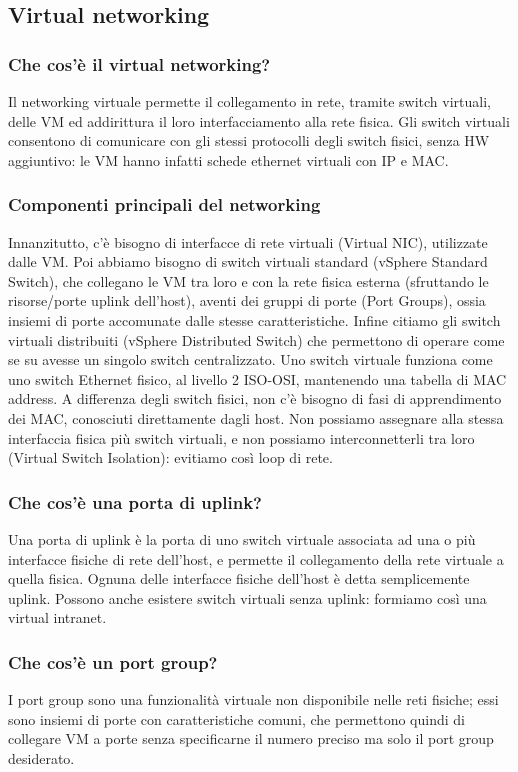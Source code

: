 \documentclass[11pt]{article}
\begin{document}
\subsection{Virtual networking}
\subsubsection{Che cos'è il virtual networking?}
Il networking virtuale permette il collegamento in rete, tramite switch virtuali, delle VM ed addirittura il loro interfacciamento alla rete fisica. Gli switch virtuali consentono di comunicare con gli stessi protocolli degli switch fisici, senza HW aggiuntivo: le VM hanno infatti schede ethernet virtuali con IP e MAC.

\subsubsection{Componenti principali del networking}
Innanzitutto, c'è bisogno di interfacce di rete virtuali (Virtual NIC), utilizzate dalle VM. Poi abbiamo bisogno di switch virtuali standard (vSphere Standard Switch), che collegano le VM tra loro e con la rete fisica esterna (sfruttando le risorse/porte uplink dell'host), aventi dei gruppi di porte (Port Groups), ossia insiemi di porte accomunate dalle stesse caratteristiche. Infine citiamo gli switch virtuali distribuiti (vSphere Distributed Switch) che permettono di operare come se su avesse un singolo switch centralizzato. Uno switch virtuale funziona come uno switch Ethernet fisico, al livello 2 ISO-OSI, mantenendo una tabella di MAC address. A differenza degli switch fisici, non c'è bisogno di fasi di apprendimento dei MAC, conosciuti direttamente dagli host. Non possiamo assegnare alla stessa interfaccia fisica più switch virtuali, e non possiamo interconnetterli tra loro (Virtual Switch Isolation): evitiamo così loop di rete.

\subsubsection{Che cos'è una porta di uplink?}
Una porta di uplink è la porta di uno switch virtuale associata ad una o più interfacce fisiche di rete dell'host, e permette il collegamento della rete virtuale a quella fisica. Ognuna delle interfacce fisiche dell'host è detta semplicemente uplink. Possono anche esistere switch virtuali senza uplink: formiamo così una virtual intranet.

\subsubsection{Che cos'è un port group?}
I port group sono una funzionalità virtuale non disponibile nelle reti fisiche; essi sono insiemi di porte con caratteristiche comuni, che permettono quindi di collegare VM a porte senza specificarne il numero preciso ma solo il port group desiderato. 
\end{document}
